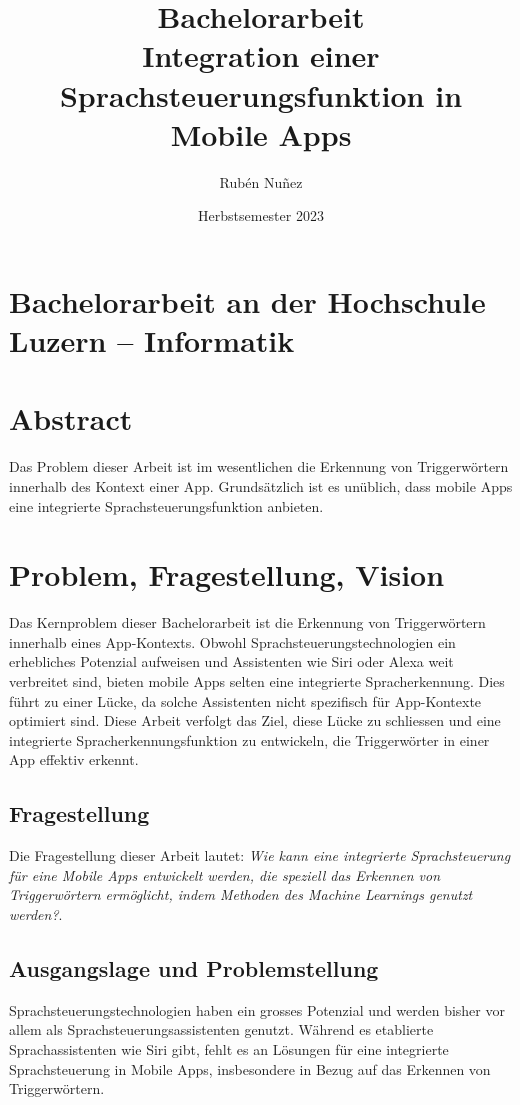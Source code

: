 \documentclass[11pt,a4paper]{article}
\title{
    {\LARGE Bachelorarbeit}\\[2em]
    {\textbf{Integration einer Sprachsteuerungsfunktion {\break} in Mobile Apps}}
}
\author{Rubén Nuñez}
\date{Herbstsemester 2023}
\begin{document}
\maketitle
\thispagestyle{empty} %
\newpage

\section*{Bachelorarbeit an der Hochschule Luzern -- Informatik}

\newpage


\section*{Abstract}
Das Problem dieser Arbeit ist im wesentlichen die Erkennung von Triggerwörtern innerhalb
des Kontext einer App. Grundsätzlich ist es unüblich, dass mobile Apps eine
integrierte Sprachsteuerungsfunktion anbieten.

\newpage
\tableofcontents

\newpage
\section{Problem, Fragestellung, Vision}
Das Kernproblem dieser Bachelorarbeit ist die Erkennung von Triggerwörtern innerhalb eines 
App-Kontexts. Obwohl Sprachsteuerungstechnologien ein erhebliches Potenzial aufweisen und 
Assistenten wie Siri oder Alexa weit verbreitet sind, bieten mobile Apps selten eine integrierte 
Spracherkennung. Dies führt zu einer Lücke, da solche Assistenten nicht spezifisch für App-Kontexte 
optimiert sind. Diese Arbeit verfolgt das Ziel, diese Lücke zu schliessen und eine integrierte 
Spracherkennungsfunktion zu entwickeln, die Triggerwörter in einer App effektiv erkennt.

\subsection{Fragestellung}
Die Fragestellung dieser Arbeit lautet: \textit{Wie kann eine integrierte Sprachsteuerung für eine
Mobile Apps entwickelt werden, die speziell das Erkennen von Triggerwörtern ermöglicht, indem 
Methoden des Machine Learnings genutzt werden?}.

\subsection*{Ausgangslage und Problemstellung}
Sprachsteuerungstechnologien haben ein grosses Potenzial und werden bisher vor allem als
Sprachsteuerungsassistenten genutzt. Während es etablierte Sprachassistenten wie Siri gibt,
fehlt es an Lösungen für eine integrierte Sprachsteuerung in Mobile Apps, insbesondere in
Bezug auf das Erkennen von Triggerwörtern.
\end{document}
